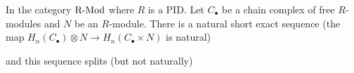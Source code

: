 \documentclass{article}
\begin{document}
\begin{theorem}
    In the category $\operatorname{R-Mod}$ where $R$ is a PID. Let $C_\bullet$ be a chain complex of free $R$-modules and $N$ be an $R$-module. There is a natural short exact sequence (the map $H_n(C_\bullet) \otimes N \to H_n(C_\bullet \times N)$ is natural)
    \begin{center}
    \end{center}

    and this sequence splits (but not naturally)
\end{theorem}
\end{document}
